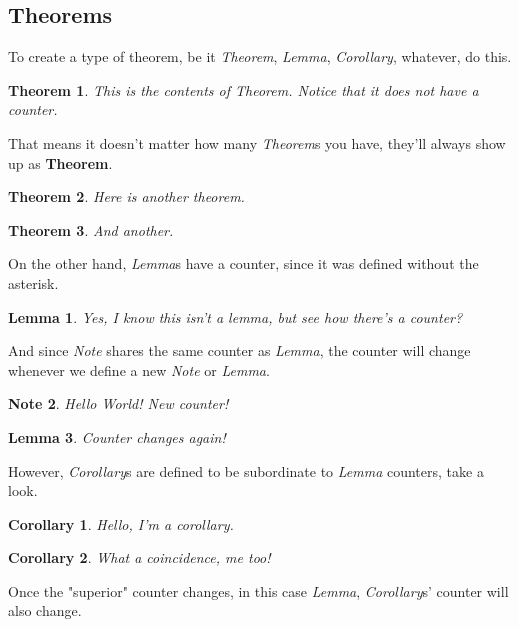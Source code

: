 \documentclass[12pt]{article}
\newtheorem*{Theorem}{Theorem}
\newtheorem{Lemma}{Lemma}
\newtheorem{Corollary}{Corollary}[Lemma]
\newtheorem{Note}[Lemma]{Note}
\begin{document}
\begin{flushleft}

\section{Theorems}
To create a type of theorem, be it \emph{Theorem}, \emph{Lemma}, \emph{Corollary}, whatever, do this.

\begin{Theorem}
This is the contents of Theorem. Notice that it does not have a counter.
\end{Theorem}

That means it doesn't matter how many \emph{Theorem}s you have, they'll always show up as \textbf{Theorem}.

\begin{Theorem}
Here is another theorem.
\end{Theorem}

\begin{Theorem}
And another.
\end{Theorem}

On the other hand, \emph{Lemma}s have a counter, since it was defined without the asterisk.

\begin{Lemma}
Yes, I know this isn't a lemma, but see how there's a counter?
\end{Lemma}

And since \emph{Note} shares the same counter as \emph{Lemma}, the counter will change whenever we define
a new \emph{Note} or \emph{Lemma}.

\begin{Note}
Hello World! New counter!
\end{Note}

\begin{Lemma}
Counter changes again!
\end{Lemma}

However, \emph{Corollary}s are defined to be subordinate to \emph{Lemma} counters, take a look.

\begin{Corollary}
Hello, I'm a corollary.
\end{Corollary}

\begin{Corollary}
What a coincidence, me too!
\end{Corollary}

Once the "superior" counter changes, in this case \emph{Lemma}, \emph{Corollary}s' counter will also change.


\end{flushleft}
\end{document}
